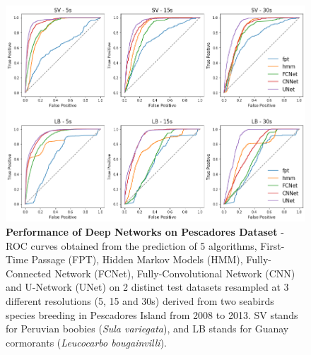 \documentclass{article}
\begin{document}
\begin{figure}[!h]
  \centering
  \includegraphics[scale=0.5]{figure_roc_training.png}
  \caption{\textbf{Performance of Deep Networks on Pescadores Dataset} - ROC curves obtained from the prediction of 5 algorithms, First-Time Passage (FPT), Hidden Markov Models (HMM), Fully-Connected Network (FCNet), Fully-Convolutional Network (CNN) and U-Network (UNet) on 2 distinct test datasets resampled at 3 different resolutions (5, 15 and 30s) derived from two seabirds species breeding in Pescadores Island from 2008 to 2013. SV stands for Peruvian boobies (\textit{Sula variegata}), and LB stands for Guanay cormorants (\textit{Leucocarbo bougainvilli}).}
  \label{figure_roc_training}
\end{figure}
\end{document}
